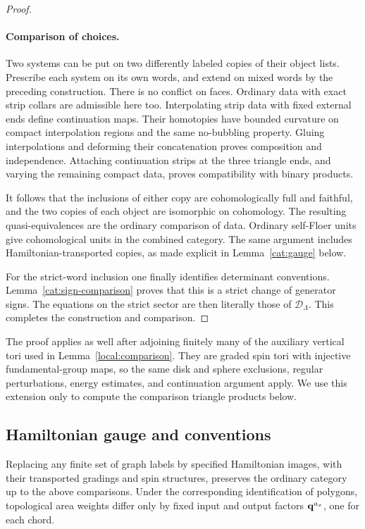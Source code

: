 \begin{proof}
\paragraph{Comparison of choices.}
Two systems can be put on two differently labeled copies of their
object lists.  Prescribe each system on its own words, and extend on
mixed words by the preceding construction.  There is no conflict on
faces.  Ordinary data with exact strip collars are admissible here too.
Interpolating strip data with fixed external ends define continuation
maps.  Their homotopies have bounded curvature on compact interpolation
regions and the same no-bubbling property.  Gluing interpolations and
deforming their concatenation proves composition and independence.
Attaching continuation strips at the three triangle ends, and varying
the remaining compact data, proves compatibility with binary products.

It follows that the inclusions of either copy are cohomologically full
and faithful, and the two copies of each object are isomorphic on
cohomology.  The resulting quasi-equivalences are the ordinary
comparison of data.  Ordinary self-Floer units give cohomological
units in the combined category.  The same argument includes
Hamiltonian-transported copies, as made explicit in
Lemma~\ref{cat:gauge} below.

For the strict-word inclusion one finally identifies determinant
conventions.  Lemma~\ref{cat:sign-comparison} proves that this is a
strict change of generator signs.  The equations on the strict
sector are then literally those of \(\mathcal D_\Lambda\).
This completes the construction and comparison.
\end{proof}

The proof applies as well after adjoining finitely many of the auxiliary
vertical tori used in Lemma~\ref{local:comparison}.  They are graded spin
tori with injective fundamental-group maps, so the same disk and sphere
exclusions, regular perturbations, energy estimates, and continuation
argument apply.  We use this extension only to compute the comparison
triangle products below.

\subsection{Hamiltonian gauge and conventions}

\begin{lemma}\label{cat:gauge}
Replacing any finite set of graph labels by specified Hamiltonian
images, with their transported gradings and spin structures, preserves
the ordinary category up to the above comparisons.  Under the
corresponding identification of polygons, topological area weights
differ only by fixed input and output factors
\(\mathbf q^{a_x}\), one for each chord.
\end{lemma}

